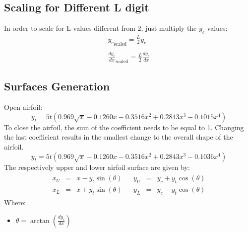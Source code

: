 \documentclass[11pt, a4paper]{article}
\begin{document}
\subsection{Scaling for Different L digit}
\label{sec: scaling 5 digits}
In order to scale for L values different from 2, just multiply the $y_c$ values:
\begin{equation}
    \begin{array}{c}
        \displaystyle {y_c}_\text{scaled}=\frac{L}{2}y_c \\\\
        \displaystyle {\frac{dy_c}{dx}}_\text{scaled}=\frac{L}{2}\frac{dy_c}{dx}
    \end{array}
\end{equation}

\subsection{Surfaces Generation}
Open airfoil:
\begin{equation}
    y_t=5t\left(0.969\sqrt{x}-0.1260x-0.3516x^2+0.2843x^3-0.1015x^4\right)
\end{equation}
To close the airfoil, the sum of the coefficient needs to be equal to 1. Changing the last coefficient results in the smallest change to the overall shape of the airfoil.
\begin{equation}
    y_t=5t\left(0.969\sqrt{x}-0.1260x-0.3516x^2+0.2843x^3-0.1036x^4\right)
\end{equation}
The respectively upper and lower airfoil surface are given by:
\begin{equation}
    \begin{matrix}
        \begin{array}{rcl}
            x_U & = & x-y_t\sin\left(\theta\right) \\
            x_L & = & x+y_t\sin\left(\theta\right)
        \end{array} & \begin{array}{rcl}
            y_U & = & y_c+y_t\cos\left(\theta\right) \\
            y_L & = & y_c-y_t\cos\left(\theta\right)
        \end{array}
    \end{matrix}
\end{equation}
Where:
\begin{itemize}
    \item $\displaystyle \theta=\arctan\left(\frac{dy_c}{dx}\right)$
\end{itemize}
\end{document}
